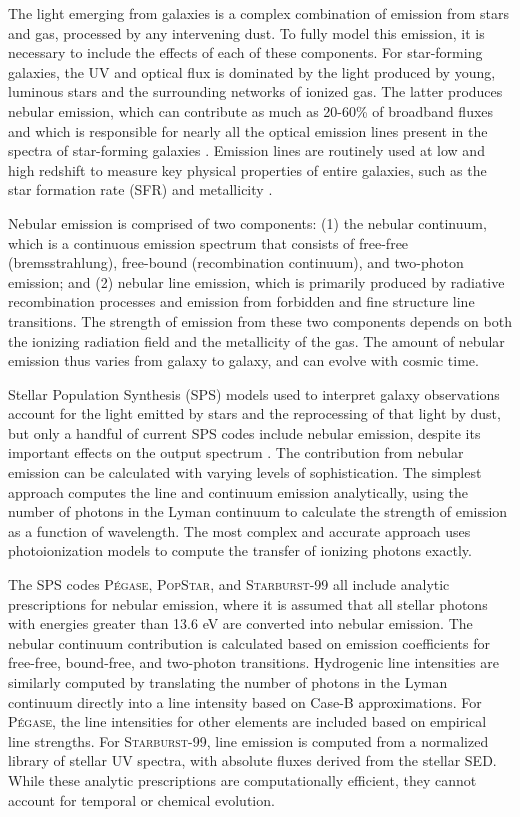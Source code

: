 \documentclass[twocolumn, tighten]{aastex61}
\newcommand{\Pegase}{\textsc{P{\'e}gase}\xspace}
\newcommand{\SB}{\textsc{Starburst-99}\xspace}
\newcommand{\Popstar}{\textsc{PopStar}\xspace}
\begin{document}
The light emerging from galaxies is a complex combination of emission from stars and gas, processed by any intervening dust. To fully model this emission, it is necessary to include the effects of each of these components. For star-forming galaxies, the UV and optical flux is dominated by the light produced by young, luminous stars and the surrounding networks of ionized gas. The latter produces nebular emission, which can contribute as much as 20-60\% of broadband fluxes and which is responsible for nearly all the optical emission lines present in the spectra of star-forming galaxies \citep{Anders03, Reines10}. Emission lines are routinely used at low and high redshift to measure key physical properties of entire galaxies, such as the star formation rate (SFR) and metallicity \citep[e.g.,][]{Tremonti04, Kewley08}.

Nebular emission is comprised of two components: (1) the nebular continuum, which is a continuous emission spectrum that consists of free-free (bremsstrahlung), free-bound (recombination continuum), and two-photon emission; and (2) nebular line emission, which is primarily produced by radiative recombination processes and emission from forbidden and fine structure line transitions. The strength of emission from these two components depends on both the ionizing radiation field and the metallicity of the gas. The amount of nebular emission thus varies from galaxy to galaxy, and can evolve with cosmic time.

Stellar Population Synthesis (SPS) models used to interpret galaxy observations account for the light emitted by stars and the reprocessing of that light by dust, but only a handful of current SPS codes include nebular emission, despite its important effects on the output spectrum \citep[see reviews in][]{Walcher11, Conroy13}. The contribution from nebular emission can be calculated with varying levels of sophistication. The simplest approach computes the line and continuum emission analytically, using the number of photons in the Lyman continuum to calculate the strength of emission as a function of wavelength. The most complex and accurate approach uses photoionization models to compute the transfer of ionizing photons exactly.

The SPS codes \Pegase \citep{Fioc99}, \Popstar \citep{Molla09}, and \SB \citep{Leitherer99} all include analytic prescriptions for nebular emission, where it is assumed that all stellar photons with energies greater than 13.6 eV are converted into nebular emission. The nebular continuum contribution is calculated based on emission coefficients for free-free, bound-free, and two-photon transitions. Hydrogenic line intensities are similarly computed by translating the number of photons in the Lyman continuum directly into a line intensity based on Case-B approximations. For \Pegase, the line intensities for other elements are included based on empirical line strengths. For \SB, line emission is computed from a normalized library of stellar UV spectra, with absolute fluxes derived from the stellar SED. While these analytic prescriptions are computationally efficient, they cannot account for temporal or chemical evolution.
\end{document}
